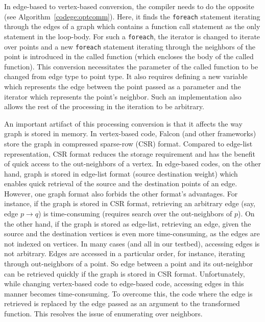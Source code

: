 In edge-based to vertex-based conversion, the compiler needs to do the opposite (see Algorithm~\ref{codege:optcomm}). 
Here, it finds the \texttt{foreach} statement iterating through the edges of a graph which contains a function call statement as the only statement in the loop-body. 
For such a \texttt{foreach}, the iterator is changed to iterate over points and a new \texttt{foreach} statement iterating through the neighbors of the point is introduced in the called function (which encloses the body of the called function). 
This conversion necessitates the parameter of the called function to be changed from edge type to point type. 
It also requires defining a new variable which represents the edge between the point passed as a parameter and the iterator which represents the point's neighbor. 
Such an implementation also allows the rest of the processing in the iteration to be arbitrary.

An important artifact of this processing conversion is that it affects the way graph is stored in memory.
In vertex-based code, Falcon (and other frameworks) store the graph in compressed sparse-row (CSR) format. 
Compared to edge-list representation, CSR format reduces the storage requirement and has the benefit of quick access to the out-neighbors of a vertex. 
In edge-based codes, on the other hand, graph is stored in edge-list format (\textsf{source destination weight}) which enables quick retrieval of the source and the destination points of an edge.
However, one graph format also forbids the other format's advantages.
For instance, if the graph is stored in CSR format, retrieving an arbitrary edge (say, edge $p \rightarrow q$) is time-consuming (requires search over the out-neighbors of $p$).
On the other hand, if the graph is stored as edge-list, retrieving an edge, given the source and the destination vertices is even more time-consuming, as the edges are not indexed on vertices. 
In many cases (and all in our testbed), accessing edges is not arbitrary. 
Edges are accessed in a particular order, for instance, iterating through out-neighbors of a point. 
So edge between a point and its out-neighbor can be retrieved quickly if the graph is stored in CSR format. 
Unfortunately, while changing vertex-based code to edge-based code, accessing edges in this manner becomes time-consuming. 
To overcome this, the code where the edge is retrieved is replaced by the edge passed as an argument to the transformed function. 
This resolves the issue of enumerating over neighbors.


